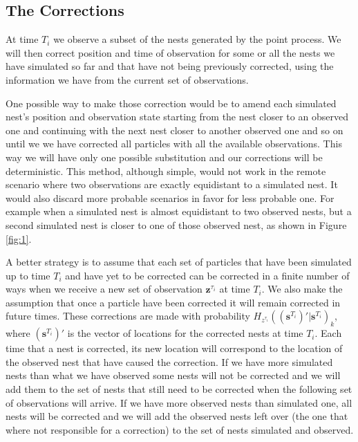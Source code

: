 \documentclass[11pt,a4paper]{article}
\renewcommand{\vec}[1]{\mathbf{#1}}
\begin{document}
{\color{red}
\subsection{The Corrections} \label{subsec:corrections}

At time $T_i$ we observe a subset of the nests generated by the point process. We will then correct position and time of observation for some or all the nests we have simulated so far and that have not being previously corrected, using the information we have from the current set of observations.

One possible way to make those correction would be to amend each simulated nest's position and observation state starting from the nest closer to an observed one and continuing with the next nest closer to another observed one and so on until we we have corrected all particles with all the available observations. This way we will have only one possible substitution and our corrections will be deterministic. This method, although simple, would not work in the remote scenario where two observations are exactly equidistant to a simulated nest. It would also discard more probable scenarios in favor for less probable one. For example when a simulated nest is almost equidistant to two observed nests, but a second simulated nest is closer to one of those observed nest, as shown in Figure \ref{fig:1}.

\begin{figure*}
\centering
\caption{[A] shows the shortest distance substitution in the deterministic scenario. [B] shows the more likely substitution that would be discarded in the deterministic scenario.}
\label{fig:1}
\end{figure*}

A better strategy is to assume that each set of particles that have been simulated up to time $T_i$ and have yet to be corrected can be corrected in a finite number of ways when we receive a new set of observation $\vec{z}^{\tau_i}$ at time $T_i$. We also make the assumption that once a particle have been corrected it will remain corrected in future times. These corrections are made with probability $H_{z^{\tau_i}}((\vec{s}^{T_i})' | \vec{s}^{T_i})_k$, where $(\vec{s}^{T_i})'$ is the vector of locations for the corrected nests at time $T_i$. Each time that a nest is corrected, its new location will correspond to the location of the observed nest that have caused the correction. If we have more simulated nests than what we have observed some nests will not be corrected and we will add them to the set of nests that still need to be corrected when the following set of observations will arrive. If we have more observed nests than simulated one, all nests will be corrected and we will add the observed nests left over (the one that where not responsible for a correction) to the set of nests simulated and observed.

}
\end{document}
